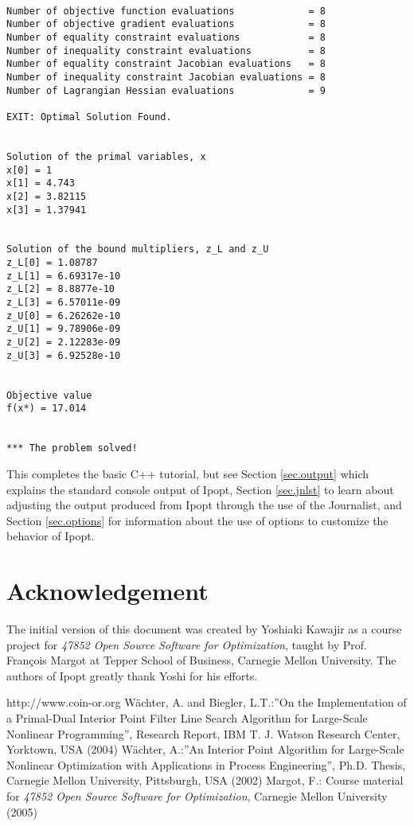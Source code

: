 \documentclass[letter,10pt]{article}
\begin{document}
{\begin{verbatim}
 
Number of objective function evaluations             = 8
Number of objective gradient evaluations             = 8
Number of equality constraint evaluations            = 8
Number of inequality constraint evaluations          = 8
Number of equality constraint Jacobian evaluations   = 8
Number of inequality constraint Jacobian evaluations = 8
Number of Lagrangian Hessian evaluations             = 9
 
EXIT: Optimal Solution Found.
 
 
Solution of the primal variables, x
x[0] = 1
x[1] = 4.743
x[2] = 3.82115
x[3] = 1.37941
 
 
Solution of the bound multipliers, z_L and z_U
z_L[0] = 1.08787
z_L[1] = 6.69317e-10
z_L[2] = 8.8877e-10
z_L[3] = 6.57011e-09
z_U[0] = 6.26262e-10
z_U[1] = 9.78906e-09
z_U[2] = 2.12283e-09
z_U[3] = 6.92528e-10
 
 
Objective value
f(x*) = 17.014
 
 
*** The problem solved!
\end{verbatim}

This completes the basic C++ tutorial, but see Section
\ref{sec.output} which explains the standard console output of Ipopt,
Section \ref{sec.jnlst} to learn about adjusting the output produced
from Ipopt through the use of the Journalist, and Section
\ref{sec.options} for information about the use of options to
customize the behavior of Ipopt.

\section*{Acknowledgement}
The initial version of this document was created by Yoshiaki Kawajir
as a course project for \textit{47852 Open Source Software for
Optimization}, taught by Prof. Fran\c cois Margot at Tepper School of
Business, Carnegie Mellon University. The authors of Ipopt greatly
thank Yoshi for his efforts.

\begin{thebibliography}{99}
http://www.coin-or.org
W\"achter, A. and Biegler, L.T.:''On the Implementation of a Primal-Dual
        Interior Point Filter Line Search Algorithm for Large-Scale
        Nonlinear Programming'', Research Report, IBM T. J. Watson
        Research Center, Yorktown, USA (2004)
W\"achter, A.:''An Interior Point Algorithm for Large-Scale Nonlinear
        Optimization with Applications in Process Engineering'',
        Ph.D. Thesis, Carnegie Mellon University, Pittsburgh, USA (2002)
Margot, F.: Course material for \textit{47852 Open Source Software for
        Optimization}, Carnegie Mellon University (2005)
\end{thebibliography}


}
\end{document}
